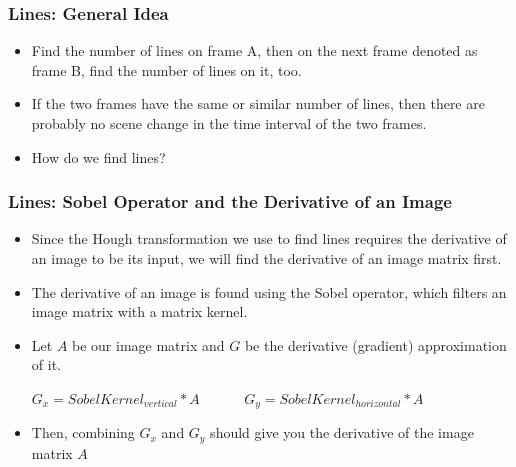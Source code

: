\documentclass{beamer}
\begin{document}
	
	\begin{frame}
	\frametitle{Lines: General Idea}
		\begin{itemize}
			\item Find the number of lines on frame A, then on the next frame denoted as frame B, find the number of lines on it, too.
			
			\pause
			
			\item If the two frames have the same or similar number of lines, then there are probably no scene change in the time interval of the two frames.
			
			\pause
			
			\item How do we find lines?
		\end{itemize}
	\end{frame}
	
	\begin{frame}
	\frametitle{Lines: Sobel Operator and the Derivative of an Image}
		\begin{itemize}
			\item Since the Hough transformation we use to find lines requires the derivative of an image to be its input, we will find the derivative of an image matrix first.
			
			\pause
			
			\item The derivative of an image is found using the Sobel operator, which filters an image matrix with a matrix kernel.
			
			\pause
			
			\item Let $A$ be our image matrix and $G$ be the derivative (gradient) approximation of it.\newline
			
			
			$G_{x} = Sobel Kernel_{vertical} \ast A$ ~~~~~ $G_{y} = Sobel Kernel_{horizontal} \ast A$\newline
			
			\item Then, combining $G_{x}$ and $G_{y}$ should give you the derivative of the image matrix $A$
			
		\end{itemize}
		
	\end{frame}
	
\end{document}
